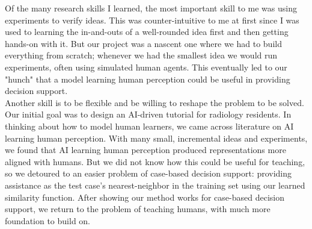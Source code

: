 Of the many research skills I learned, the most important skill to me was using experiments to verify ideas. This was counter-intuitive to me at first since I was used to learning the in-and-outs of a well-rounded idea first and then getting hands-on with it. But our project was a nascent one where we had to build everything from scratch; whenever we had the smallest idea we would run experiments, often using simulated human agents. This eventually led to our "hunch" that a model learning human perception could be useful in providing decision support.
\\
Another skill is to be flexible and be willing to reshape the problem to be solved. Our initial goal was to design an AI-driven tutorial for radiology residents. In thinking about how to model human learners, we came across literature on AI learning human perception. With many small, incremental ideas and experiments, we found that AI learning human perception produced representations more aligned with humans. But we did not know how this could be useful for teaching, so we detoured to an easier problem of case-based decision support: providing assistance as the test case's nearest-neighbor in the training set using our learned similarity function. After showing our method works for case-based decision support, we return to the problem of teaching humans, with much more foundation to build on.
\\


